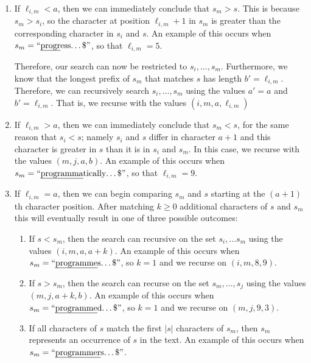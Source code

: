 \begin{enumerate}
\item If $\ell_{i,m}< a$, then we can immediately conclude that $s_m > s$. This is because $s_m > s_i$, so the character at position 
$\ell_{i,m}+1$ in $s_m$ is greater than the corresponding character in $s_i$ and $s$.  An example of this occurs when $s_m=\text{``\uline{progr}ess\ldots\$''}$, so that $\ell_{i,m}=5$.

Therefore, our search can now be restricted to $s_i,\ldots,s_{m}$.  Furthermore, we know that the longest prefix of $s_m$ that matches $s$ has length $b'=\ell_{i,m}$.  Therefore, we can recursively search $s_i,\ldots,s_{m}$ using the values $a'=a$ and $b'=\ell_{i,m}$. That is, we recurse with the values $(i,m,a,\ell_{i,m})$

\item If $\ell_{i,m} > a$, then we can immediately conclude that $s_m < s$, for the same reason that $s_i < s$; namely $s_i$ and $s$ differ in character $a+1$ and this character is greater in $s$ than it is in $s_i$ and $s_m$.
In this case, we recurse with the values $(m,j,a, b)$.
An example of this occurs when $s_m=\text{``\uline{programma}tically\ldots\$''}$, so that $\ell_{i,m}=9$.

\item If $\ell_{i,m}= a$, then we can begin comparing $s_m$ and $s$ starting at the $(a+1)$th character position. After matching $k\ge0$ additional characters of $s$ and $s_m$ this will eventually result in one of three possible outcomes:
\begin{enumerate}
  \item If $s < s_m$, then the search can recursive on the set $s_i,\ldots s_m$ using the values $(i,m,a,a+k)$.  An example of this occurs when $s_m=\text{``\uline{programme}s\ldots\$''}$, so $k=1$ and we recurse on $(i,m,8,9)$.

  \item If $s > s_m$, then the search can recurse on the set $s_m,\ldots,s_j$ using the values $(m,j,a+k, b)$.  An example of this occurs when $s_m=\text{``\uline{programme}d\ldots\$''}$, so $k=1$ and we recurse on $(m,j,9,3)$.

  \item If all characters of $s$ match the first $|s|$ characters of $s_m$, then $s_m$ represents an occurrence of $s$ in the text.
  An example of this occurs when $s_m=\text{``\uline{programmer}s\ldots\$''}$.
\end{enumerate}
\end{enumerate}

